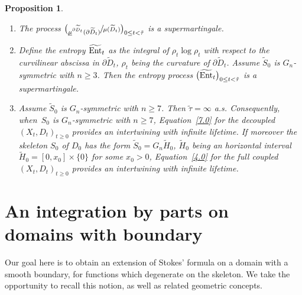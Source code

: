\documentclass[JEP,XML,SOM,Unicode,NoFloatCountersInSection,published]{cedram}
\theoremstyle{plain}
\newtheorem{prop}[thm]{Proposition}
\theoremstyle{definition}
\newcommand{\usm}{{\underline{\smash{\mu}}}}
\let\di\displaystyle
\let\wi\widetilde
\begin{document}
\skpt
\begin{prop}
\label{P5.4.4}
\begin{enumerate}
\item The process $\di \bigl(\sfrac{\usm^{\partial\wi D_t}(\partial\wi D_t)}{\mu(\wi D_t)}\bigr)_{0\le t<\tilde \tau}$ is a supermartingale.
\item Define the entropy $\widetilde{\rm{Ent}}_t$ as the integral of $\rho_t\log \rho_t$ with respect to the curvilinear abscissa in $\partial \tilde D_t$, $\rho_t$ being the curvature of $\partial \tilde D_t$.
Assume $\tilde S_0$ is $G_n$-symmetric with $n\ge 3$. Then the entropy process $\bigl(\widetilde{\rm{Ent}}_t \bigr)_{0\le t<\tilde \tau}$ is a supermartingale.
\item Assume $\tilde S_0$ is $G_n$-symmetric with $n\ge 7$. Then $\tilde \tau=\infty$ a.s. Consequently, when~$ S_0$ is $G_n$-symmetric with $n\ge 7$,
Equation~\eqref{7.0} for the decoupled $(X_t,D_t)_{t\ge 0}$ provides an intertwining with infinite lifetime. If moreover the skeleton $S_0$ of $D_0$ has the form $\wi S_0=G_n\wi H_0$, $\wi H_0$ being an horizontal interval $\wi H_0=[0, x_0]\times \{0\}$ for some $ x_0>0$, Equation~\eqref{4.0} for the full coupled $(X_t,D_t)_{t\ge 0}$ provides an intertwining with infinite lifetime.
\end{enumerate}
\end{prop}

\appendix
\renewcommand{\theequation}{\Alph{section}.\arabic{equation}}

\section{An integration by parts on domains with boundary}
\label{Section2}

Our goal here is to obtain an extension of Stokes' formula on a domain with a smooth boundary, for functions which degenerate on the skeleton.
We take the opportunity to recall this notion, as well as related geometric concepts.
\end{document}
